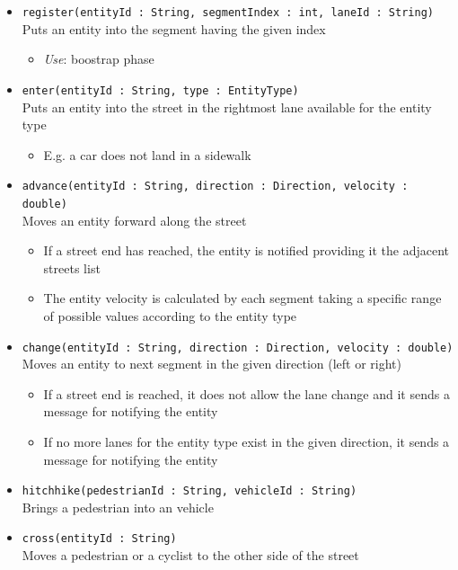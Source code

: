 \begin{itemize}
	\item \texttt{register(entityId : String, segmentIndex : int, laneId : String)}
	\\Puts an entity into the segment having the given index
	\begin{itemize}
		\item \textit{Use}: boostrap phase
	\end{itemize}
	\item \texttt{enter(entityId : String, type : EntityType)}
	\\Puts an entity into the street in the rightmost lane available for the entity type
	\begin{itemize}
		\item E.g. a car does not land in a sidewalk
	\end{itemize}
	\item \texttt{advance(entityId : String, direction : Direction, velocity : double)}
	\\Moves an entity forward along the street	
	\begin{itemize}
		\item If a street end has reached, the entity is notified providing it the adjacent streets list
		\item The entity velocity is calculated by each segment taking a specific range of possible values according to the entity type
	\end{itemize}
	\item \texttt{change(entityId : String, direction : Direction, velocity : double)}
	\\Moves an entity to next segment in the given direction (left or right)	
	\begin{itemize}
		\item If a street end is reached, it does not allow the lane change and it sends a message for notifying the entity
		\item If no more lanes for the entity type exist in the given direction, it sends a message for notifying the entity
	\end{itemize}
	\item \texttt{hitchhike(pedestrianId : String, vehicleId : String)}
	\\Brings a pedestrian into an vehicle
	\item \texttt{cross(entityId : String)}
	\\Moves a pedestrian or a cyclist to the other side of the street
	\begin{itemize}

\end{itemize}
\end{itemize}
